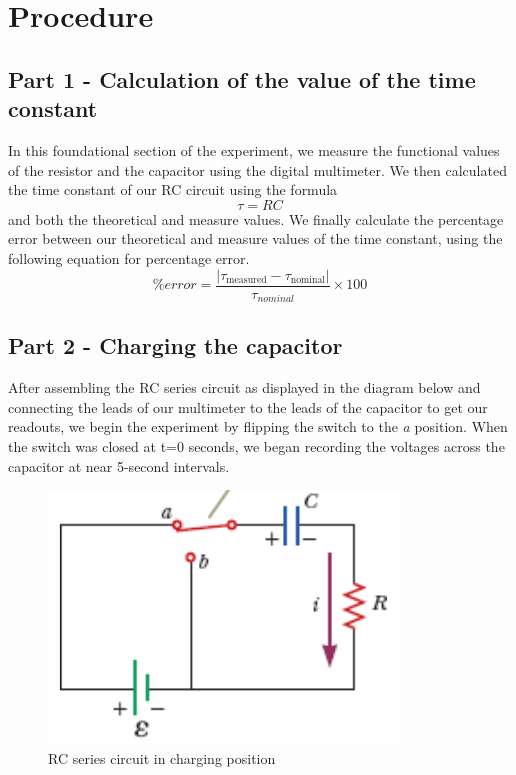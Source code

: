 \documentclass[titlepage]{article}
\begin{document}
\section{Procedure}
    \subsection{Part 1 - Calculation of the value of the time constant} 
    In this foundational section of the experiment, we measure the functional values of the resistor and the capacitor using the digital multimeter. We then calculated the time constant of our RC circuit using the formula $$\tau = RC$$ and both the theoretical and measure values.
    We finally calculate the percentage error between our theoretical and measure values of the time constant, using the following equation for percentage error. $$\% error = \frac{|\tau_\text{measured} - \tau_\text{nominal}|}{\tau_{nominal}} \times 100$$



    \subsection{Part 2 - Charging the capacitor} 
    After assembling the RC series circuit as displayed in the diagram below and connecting the leads of our multimeter to the leads of the capacitor to get our readouts, we begin the experiment by flipping the switch to the \emph{a} position. When the switch was closed at t=0 seconds, we began recording the voltages across the capacitor at near 5-second intervals. 

    \begin{figure}[hbt!]
        \centering
        \caption{RC series circuit in charging position}
        \includegraphics[scale=0.3]{images/procedure/charging.png}
    \end{figure}
\end{document}
